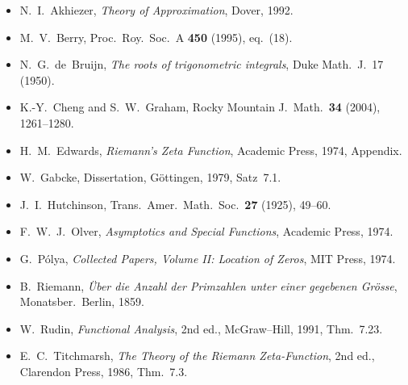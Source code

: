 \documentclass[11pt,a4paper]{article}
\theoremstyle{definition}
\begin{document}
\begin{itemize}[leftmargin=*]
  \item N.~I.~Akhiezer, \emph{Theory of Approximation}, Dover, 1992.
  \item M.~V.~Berry, Proc.\ Roy.\ Soc.\ A \textbf{450} (1995), eq.~(18).
  \item N.~G.~de~Bruijn, \emph{The roots of trigonometric integrals}, Duke Math.\ J.\ 17 (1950).
  \item K.-Y.~Cheng and S.~W.~Graham, Rocky Mountain J.\ Math.\ \textbf{34} (2004), 1261--1280.
  \item H.~M.~Edwards, \emph{Riemann's Zeta Function}, Academic Press, 1974, Appendix.
  \item W.~Gabcke, Dissertation, G\"ottingen, 1979, Satz~7.1.
  \item J.~I.~Hutchinson, Trans.\ Amer.\ Math.\ Soc.\ \textbf{27} (1925), 49--60.
  \item F.~W.~J.~Olver, \emph{Asymptotics and Special Functions}, Academic Press, 1974.
  \item G.~P\'olya, \emph{Collected Papers, Volume II: Location of Zeros}, MIT Press, 1974.
  \item B.~Riemann, \emph{\"Uber die Anzahl der Primzahlen unter einer gegebenen Gr\"osse},
  Monatsber.\ Berlin, 1859.
  \item W.~Rudin, \emph{Functional Analysis}, 2nd ed., McGraw--Hill, 1991, Thm.~7.23.
  \item E.~C.~Titchmarsh, \emph{The Theory of the Riemann Zeta-Function},
  2nd ed., Clarendon Press, 1986, Thm.~7.3.
\end{itemize}
\end{document}
